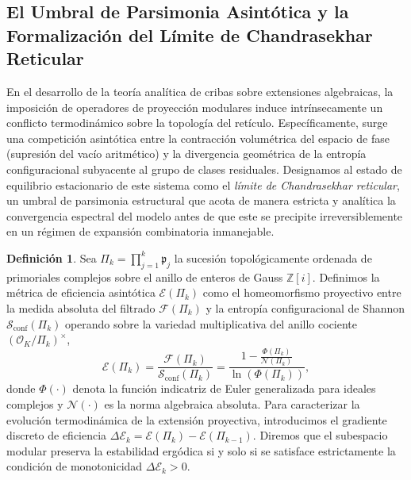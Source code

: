 \documentclass{article}
\numberwithin{equation}{section}
\theoremstyle{plain}
\theoremstyle{definition}
\newtheorem{definicion}[teorema]{Definición}
\begin{document}
\subsection{El Umbral de Parsimonia Asintótica y la Formalización del Límite de Chandrasekhar Reticular}

En el desarrollo de la teoría analítica de cribas sobre extensiones algebraicas, la imposición de operadores de proyección modulares induce intrínsecamente un conflicto termodinámico sobre la topología del retículo. Específicamente, surge una competición asintótica entre la contracción volumétrica del espacio de fase (supresión del vacío aritmético) y la divergencia geométrica de la entropía configuracional subyacente al grupo de clases residuales. Designamos al estado de equilibrio estacionario de este sistema como el \textit{límite de Chandrasekhar reticular}, un umbral de parsimonia estructural que acota de manera estricta y analítica la convergencia espectral del modelo antes de que este se precipite irreversiblemente en un régimen de expansión combinatoria inmanejable.

\begin{definicion}
Sea $\Pi_k = \prod_{j=1}^k \mathfrak{p}_j$ la sucesión topológicamente ordenada de primoriales complejos sobre el anillo de enteros de Gauss $\mathbb{Z}[i]$. Definimos la métrica de eficiencia asintótica $\mathcal{E}(\Pi_k)$ como el homeomorfismo proyectivo entre la medida absoluta del filtrado $\mathcal{F}(\Pi_k)$ y la entropía configuracional de Shannon $\mathcal{S}_{\mathrm{conf}}(\Pi_k)$ operando sobre la variedad multiplicativa del anillo cociente $(\mathcal{O}_K/\Pi_k)^\times$,
\begin{equation}
    \mathcal{E}(\Pi_k) = \frac{\mathcal{F}(\Pi_k)}{\mathcal{S}_{\mathrm{conf}}(\Pi_k)} = \frac{1 - \frac{\Phi(\Pi_k)}{\mathcal{N}(\Pi_k)}}{\ln(\Phi(\Pi_k))},
\end{equation}
donde $\Phi(\cdot)$ denota la función indicatriz de Euler generalizada para ideales complejos y $\mathcal{N}(\cdot)$ es la norma algebraica absoluta. 
Para caracterizar la evolución termodinámica de la extensión proyectiva, introducimos el gradiente discreto de eficiencia $\Delta \mathcal{E}_k = \mathcal{E}(\Pi_{k}) - \mathcal{E}(\Pi_{k-1})$. Diremos que el subespacio modular preserva la estabilidad ergódica si y solo si se satisface estrictamente la condición de monotonicidad $\Delta \mathcal{E}_k > 0$.
\end{definicion}
\end{document}

